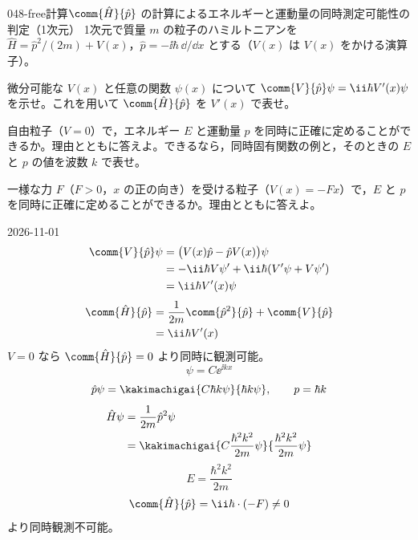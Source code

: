 \documentclass[uplatex,dvipdfmx,a4paper,11pt]{jsarticle}
\begin{document}
\begin{mondai}{048-free}{計算}{$\comm{\hat{H}}{\hat{p}}$ の計算によるエネルギーと運動量の同時測定可能性の判定（1次元）}
1次元で質量 $m$ の粒子のハミルトニアンを $\hat{H}=\hat{p}^{2}/(2m)+V(x)$，$\hat{p}=-\ii\hbar\,\dd/\dd x$ とする（$V(x)$ は $V(x)$ をかける演算子）。
  \begin{shoumon}
    \item 微分可能な $V(x)$ と任意の関数 $\psi(x)$ について $\comm{V}{\hat{p}}\psi=\ii\hbar V'(x)\psi$ を示せ。これを用いて $\comm{\hat{H}}{\hat{p}}$ を $V'(x)$ で表せ。
    \item 自由粒子（$V=0$）で，エネルギー $E$ と運動量 $p$ を同時に正確に定めることができるか。理由とともに答えよ。できるなら，同時固有関数の例と，そのときの $E$ と $p$ の値を波数 $k$ で表せ。
    \item 一様な力 $F$（$F>0$，$x$ の正の向き）を受ける粒子（$V(x)=-Fx$）で，$E$ と $p$ を同時に正確に定めることができるか。理由とともに答えよ。
  \end{shoumon}
\begin{kotaeutsushi}{2026-11-01}
\begin{align*}
\comm{V}{\hat{p}}\psi&=\bigl(V(x)\hat{p}-\hat{p}V(x)\bigr)\psi\\
&=-\ii\hbar V\psi'+\ii\hbar(V'\psi+V\psi')\\
&=\ii\hbar V'(x)\psi
\end{align*}
\begin{align*}
\comm{\hat{H}}{\hat{p}}&=\frac{1}{2m}\comm{\hat{p}^{2}}{\hat{p}}+\comm{V}{\hat{p}}\\
&=\ii\hbar V'(x)
\end{align*}
$V=0$ なら $\comm{\hat{H}}{\hat{p}}=0$ より同時に観測可能。
\[ \psi=C\ee^{\ii kx} \]
\[ \hat{p}\psi=\kakimachigai{C\hbar k\psi}{\hbar k\psi},\qquad p=\hbar k \]
\begin{align*}
\hat{H}\psi&=\frac{1}{2m}\hat{p}^{2}\psi\\
&=\kakimachigai{C\frac{\hbar^{2}k^{2}}{2m}\psi}{\frac{\hbar^{2}k^{2}}{2m}\psi}
\end{align*}
\[ E=\frac{\hbar^{2}k^{2}}{2m} \]
\[ \comm{\hat{H}}{\hat{p}}=\ii\hbar\cdot(-F)\neq0 \]
より同時観測不可能。

\end{kotaeutsushi}
\end{mondai}
\end{document}

